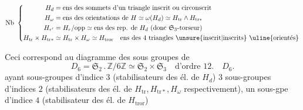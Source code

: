

\[
\mathrm{Nb}\ \left\{\begin{aligned}
H_d&=\text{ens des sommets d'un triangle inscrit ou circonscrit}\\
H_\omega&=\text{ens des orientations de }H\simeq\omega(H_d)\simeq H_{\mathrm{tr}}\wedge H_{\mathrm{tr}*}\\
H_{r'}&=H_r/\mathrm{opp}\simeq\text{ens des rep. de }H_d\text{ (donc $\mathfrak S_3$-torseur)}\\
H_{\mathrm{tr}}\times H_{\mathrm{tr}*}&\simeq H_{\mathrm{tr}}\times H_\omega\simeq H_{\mathrm{tror}}\quad\text{ens des 4 triangles \unsure{inscrit|inscrits} \uline{orientés}}
\end{aligned}\right.
\]

Ceci correspond au diagramme des sous groupes de
\[
D_6=\mathfrak S_2\mathbin{.}\mathbb Z/6\mathbb Z\simeq\mathfrak S_2\times\mathfrak S_3\quad\text{d'ordre }12.\quad D_6.
\]
ayant   sous-groupes  d'indice $3$ (stabilisateurs des  él. de $H_d$) $3$ sous-groupes  d'indices $2$ (stabilisateurs des él. de $H_{\mathrm{tr}},H_{\mathrm{tr}*},H_\omega$ respectivement), un sous-gpe d'indice $4$ (stabilisateur des él. de $H_{\mathrm{tror}}$)



